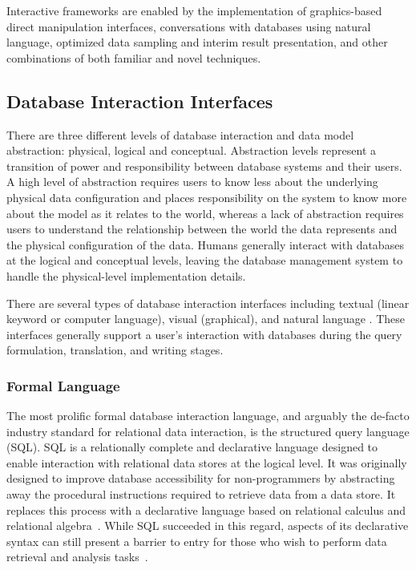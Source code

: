 Interactive frameworks are enabled by the implementation of graphics-based direct manipulation interfaces, conversations with databases using natural language, optimized data sampling and interim result presentation, and other combinations of both familiar and novel techniques.



\subsection{Database Interaction Interfaces}

There are three different levels of database interaction and data model abstraction: physical, logical and conceptual. Abstraction levels represent a transition of power and responsibility between database systems and their users. A high level of abstraction requires users to know less about the underlying physical data configuration and places responsibility on the system to know more about the model as it relates to the world, whereas a lack of abstraction requires users to understand the relationship between the world the data represents and the physical configuration of the data. \cite{10.2307/249587, 1268162} Humans generally interact with databases at the logical and conceptual levels, leaving the database management system to handle the physical-level implementation details.

There are several types of database interaction interfaces including textual (linear keyword or computer language), visual (graphical), and natural language \cite{1637793}. These interfaces generally support a user's interaction with databases during the query formulation, translation, and writing stages. 

\subsubsection{Formal Language}

The most prolific formal database interaction language, and arguably the de-facto industry standard for relational data interaction, is the structured query language (SQL). 
SQL is a relationally complete and declarative language designed to enable interaction with relational data stores at the logical level. 
It was originally designed to improve database accessibility for non-programmers by abstracting away the procedural instructions required to retrieve data from a data store. 
It replaces this process with a declarative language based on relational calculus and relational algebra~\cite{Chamberlin1974}. 
While SQL succeeded in this regard, aspects of its declarative syntax can still present a barrier to entry for those who wish to perform data retrieval and analysis tasks~\cite{10.1145/3514214, 10.1145/2729094.2742620}.

